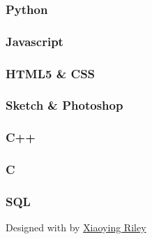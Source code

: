 \documentclass[english,]{article}
\begin{document}
\hypertarget{python}{%
\subsubsection{Python}\label{python}}

\hypertarget{javascript}{%
\subsubsection{Javascript}\label{javascript}}

\hypertarget{html5-css}{%
\subsubsection{HTML5 \& CSS}\label{html5-css}}

\hypertarget{sketch-photoshop}{%
\subsubsection{Sketch \& Photoshop}\label{sketch-photoshop}}

\hypertarget{c}{%
\subsubsection{C++}\label{c}}

\hypertarget{c-1}{%
\subsubsection{C}\label{c-1}}

\hypertarget{sql}{%
\subsubsection{SQL}\label{sql}}

{Designed with \emph{} by \href{http://themes.3rdwavemedia.com}{Xiaoying
Riley}}
\end{document}
